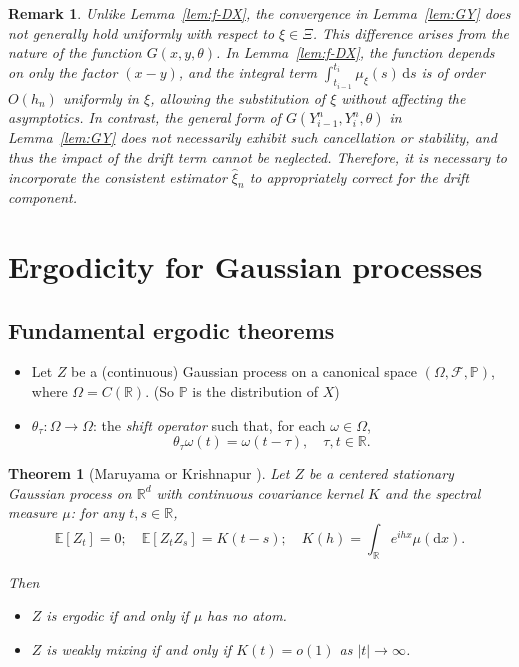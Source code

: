 \documentclass[a4paper,10pt,twoside]{article}
\newtheorem{thm}{Theorem}[section]
\newtheorem{remark}{Remark}[section]
\numberwithin{equation}{section}
\def\R{\mathbb{R}}
\def\th{\theta}
\def\F{\mathcal{F}}
\def\P{{\mathbb{P}}}
\def\E{\mathbb{E}}
\def\df{\mathrm{d}}
\newcommand{\bi}{\begin{itemize}}
\newcommand{\ei}{\end{itemize}}
\begin{document}
\begin{remark}
Unlike Lemma~\ref{lem:f-DX}, the convergence in Lemma~\ref{lem:GY} does not generally hold uniformly with respect to $\xi \in \Xi$.
This difference arises from the nature of the function $G(x, y, \theta)$. In Lemma~\ref{lem:f-DX}, the function depends on only the factor $(x - y)$, and the integral term $\int_{t_{i-1}}^{t_i} \mu_\xi(s)\,\df s$ is of order $O(h_n)$ uniformly in $\xi$, allowing the substitution of $\xi$ without affecting the asymptotics. In contrast, the general form of $G(Y^n_{i-1}, Y^n_i, \theta)$ in Lemma~\ref{lem:GY} does not necessarily exhibit such cancellation or stability, and thus the impact of the drift term cannot be neglected. Therefore, it is necessary to incorporate the consistent estimator $\widehat{\xi}_n$ to appropriately correct for the drift component.
\end{remark}






\section{Ergodicity for Gaussian processes}\label{app:C}
\subsection{Fundamental ergodic theorems}
\bi
\item Let $Z$ be a (continuous) Gaussian process on a canonical space $(\Omega,\F,\P)$, where $\Omega = C(\R)$. (So $\P$ is the distribution of $X$)
\item $\th_\tau: \Omega \to \Omega$: the {\it shift operator} such that, for each $\omega\in \Omega$,
\[
\th_\tau\omega(t) = \omega(t - \tau),\quad \tau,t\in \R. 
\]
\ei

\begin{thm}[Maruyama \cite{m49} or Krishnapur \cite{k9}]\label{thm:maruyama}
Let $Z$ be a centered stationary Gaussian process on $\R^d$ with continuous covariance kernel $K$ and the spectral measure $\mu$:
for any $t,s\in \R$,
\[
\E[Z_t] = 0;\quad \E[Z_tZ_s]=K(t-s); \quad K(h) = \int_\R e^{ih x} \mu(\df x).
\]

Then
\bi
\item[(i)] $Z$ is ergodic if and only if $\mu$ has no atom.
\item[(ii) ] $Z$ is weakly mixing if and only if $K(t) =o(1)$ as $|t|\to \infty$.
\ei

\end{thm}
\end{document}

